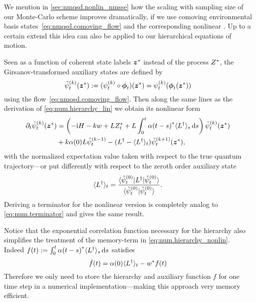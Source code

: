 We mention in \autoref{sec:nmqsd.nonlin_nmsse} how the scaling with sampling size of our Monte-Carlo scheme improves dramatically, if we use comoving environmental basis states~\ref{eq:nmqsd.comoving_flow} and the corresponding nonlinear \NMSSE\@.
Up to a certain extend this idea can also be applied to our hierarchical equations of motion.

Seen as a function of coherent state labels ${\boldsymbol{z}}^*$ instead of the process ${Z}^*$, the Girsanov-transformed auxiliary states are defined by
\begin{equation*}
  \tilde\psi_t^{(k)}(\cc\zz) := (\psit[k] \circ \vec\phi_t)(\cc\zz) = \psit[k](\vec\phi_t(\cc\zz))
\end{equation*}
using the  flow~\ref{eq:nmqsd.comoving_flow}.
Then along the same lines as the derivation of \autoref{eq:num.hierarchy_lin} we obtain its nonlinear form
\begin{align}
  \partial_t \tilde\psi_t^{(k)}({\boldsymbol{z}}^*) &= \left( -\mathrm{i}H - kw + L{Z}^*_t + L \int_0^t {\alpha(t-s)}^* \langle L^\dagger \rangle_s \, \mathrm{d} s \right)\tilde\psi_t^{(k)}({\boldsymbol{z}}^*) \nonumber\\
  &+ k \alpha(0) L \tilde\psi_t^{(k-1)} - (L^\dagger - \langle L^\dagger \rangle_t) \tilde\psi_t^{(k+1)}({\boldsymbol{z}}^*),
  \label{eq:num.hierarchy_nonlin}
\end{align}
with the normalized expectation value taken with respect to the true quantum trajectory---or put differently with respect to the zeroth order auxiliary state
\begin{equation}
  \langle L^\dagger \rangle_t = \frac{\langle \tilde\psi_t^{(0)} | L^\dagger | \tilde\psi_t^{(0)} \rangle}{\langle \tilde\psi_t^{(0)} | \tilde\psi_t^{(0)} \rangle}.
  \label{eq:num.qmean}
\end{equation}
Deriving a terminator for the nonlinear version is completely analog to \autoref{eq:num.terminator} and gives the same result.

Notice that the exponential correlation function necessary for the hierarchy also simplifies the treatment of the memory-term in \autoref{eq:num.hierarchy_nonlin}.
Indeed $f(t) := \int_0^t {\alpha(t-s)}^* \langle L^\dagger \rangle_s \, \mathrm{d} s$ satisfies
\begin{equation}
  \dot f(t) = \alpha(0) \langle L^\dagger \rangle_t - {w}^* f(t)
  \label{eq:num.memory_term}
\end{equation}
Therefore we only need to store the hierarchy and auxiliary function $f$ for one time step in a numerical implementation---making this approach very memory efficient.

